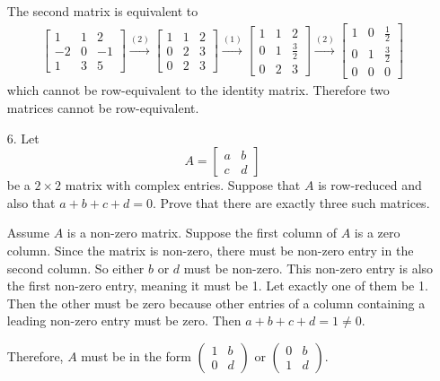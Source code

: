 \documentclass{article}
\begin{document}
\begin{enumerate}[listparindent=\parindent]
The second matrix is equivalent to
\begin{gather*}
    \begin{bmatrix}
        1 & 1 & 2 \\
        -2 & 0 & -1 \\
        1 & 3 & 5
    \end{bmatrix}
    \xrightarrow{(2)}
    \begin{bmatrix}
        1 & 1 & 2 \\
        0 & 2 & 3 \\
        0 & 2 & 3
    \end{bmatrix}
    \xrightarrow{(1)}
    \begin{bmatrix}
        1 & 1 & 2 \\
        0 & 1 & \frac{3}{2} \\
        0 & 2 & 3
    \end{bmatrix}
    \xrightarrow{(2)}
    \boxed{
        \begin{bmatrix}
            1 & 0 & \frac{1}{2} \\
            0 & 1 & \frac{3}{2} \\
            0 & 0 & 0
        \end{bmatrix}
    }
\end{gather*}
which cannot be row-equivalent to the identity matrix.
Therefore two matrices cannot be row-equivalent.

\item[6.] Let
    \[
        A = \begin{bmatrix}
            a & b \\ c & d
        \end{bmatrix}
    \]
    be a \(2 \times 2\) matrix with complex entries. Suppose that \(A\) is row-reduced and also that \(a + b + c + d = 0\).
    Prove that there are exactly three such matrices.

Assume \(A\) is a non-zero matrix.
Suppose the first column of \(A\) is a zero column.
Since the matrix is non-zero, there must be non-zero entry in the second column. So either \(b\) or \(d\) must be non-zero.
This non-zero entry is also the first non-zero entry, meaning it must be 1. Let exactly one of them be 1.
Then the other must be zero because other entries of a column containing a leading non-zero entry must be zero.
Then \(a + b + c + d = 1 \neq 0\).

Therefore, \(A\) must be in the form \( (\begin{smallmatrix} 1 & b \\ 0 & d \end{smallmatrix}) \)
or \( (\begin{smallmatrix} 0 & b \\ 1 & d \end{smallmatrix}) \).


\end{enumerate}
\end{document}
